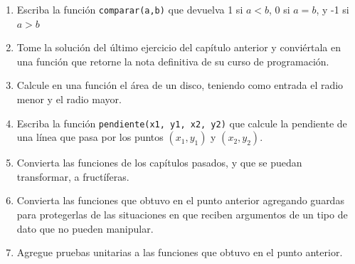 \begin{enumerate}

 \item Escriba la función \verb+comparar(a,b)+ que devuelva 1 si $a<b$, 0 si $a=b$, y -1 si $a>b$
 
 \item Tome la solución del último ejercicio del capítulo anterior y conviértala en una función que retorne la nota 
 definitiva de su curso de programación.
 
 \item Calcule en una función el área de un disco, teniendo como entrada el radio menor y el radio mayor.
 
 \item Escriba la función \verb+pendiente(x1, y1, x2, y2)+ que calcule la pendiente de una línea que pasa por los puntos 
 $(x_1, y_1)$ y $(x_2, y_2)$. 
 
 \item Convierta las funciones de los capítulos pasados, y que se puedan transformar, a fructíferas.
 
 \item Convierta las funciones que obtuvo en el punto anterior agregando guardas para protegerlas de las situaciones
 en que reciben argumentos de un tipo de dato que no pueden manipular.
 
 \item Agregue pruebas unitarias a las funciones que obtuvo en el punto anterior.
 
\end{enumerate}
